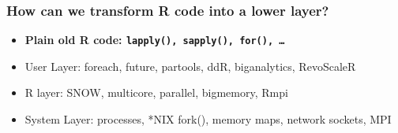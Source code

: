 \documentclass{beamer}
\begin{document}
\begin{frame}

    \frametitle{How can we transform R code into a lower layer?}

\begin{itemize}
    \item \textbf{Plain old R code: \texttt{lapply(), sapply(), for(), \dots}}
\item User Layer: foreach, future, partools, ddR, biganalytics, RevoScaleR
\item R layer: SNOW, multicore, parallel, bigmemory, Rmpi
\item System Layer: processes, *NIX fork(), memory maps, network sockets,
    MPI
\end{itemize}


\end{frame}
\end{document}
